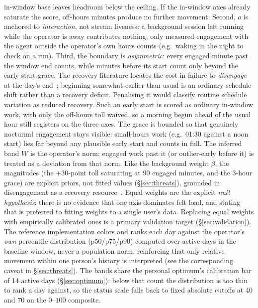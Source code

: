 \documentclass[10pt,twocolumn]{article}
\begin{document}
in-window base leaves headroom below the ceiling. If the in-window axes already
saturate the score, off-hours minutes produce no further movement. Second, $o$ is anchored
to \emph{interaction}, not stream liveness: a background session left running
while the operator is away contributes nothing; only measured engagement with
the agent outside the operator's own hours counts (e.g.\ waking
in the night to check on a run). Third, the boundary is \emph{asymmetric}:
every engaged minute past the window end counts, while minutes before its start
count only beyond the early-start grace. The recovery literature locates the
cost in failure to \emph{disengage} at the day's end~\cite{sonnentag2007};
beginning somewhat earlier than usual is an ordinary schedule shift rather than
a recovery deficit. Penalising it would classify routine schedule variation as
reduced recovery. Such an early start is scored as ordinary in-window work, with only
the off-hours toll waived, so a morning begun ahead of the usual hour still
registers on the three axes. The grace is bounded so that genuinely nocturnal engagement stays
visible: small-hours work (e.g.\ 01:30 against a noon start) lies far beyond
any plausible early start and counts in full. The
inferred band $W$ is the operator's norm; engaged work past it (or
outlier-early before it) is treated as a deviation from that norm. Like the
background weight $\beta$, the magnitudes (the $+30$-point toll saturating at
$90$ engaged minutes, and the $3$-hour grace) are explicit priors, not fitted
values (\S\ref{sec:threats}), grounded in disengagement as a recovery
resource~\cite{sonnentag2007}.
Equal weights are the explicit \emph{null hypothesis}: there is
no evidence that one axis dominates felt load, and stating that is preferred
to fitting weights to a single user's data. Replacing equal weights with empirically
calibrated ones is a primary validation target (\S\ref{sec:validation}).
The reference implementation colors and ranks each day against the
operator's \emph{own} percentile distribution (p50/p75/p90) computed over
active days in the baseline window, never a population norm, reinforcing
that only relative movement within one person's history is interpreted
(see the corresponding caveat in \S\ref{sec:threats}). The bands share the
personal optimum's calibration bar of 14 active days (\S\ref{sec:optimum}):
below that count the distribution is too thin to rank a day against, so the
status scale falls back to fixed absolute cutoffs at 40 and 70 on the
$0$--$100$ composite.
\end{document}
